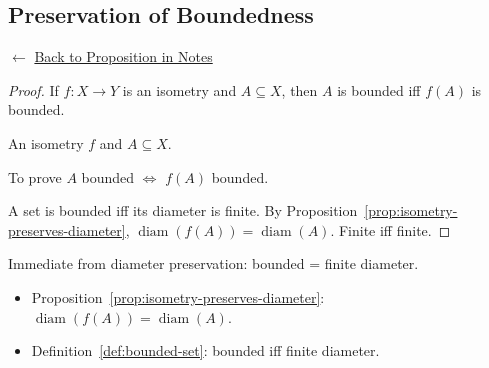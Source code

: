 
\subsection*{Preservation of Boundedness}
\label{prf:isometry-preserves-bounded}

\begin{remark*}[Return]
$\leftarrow$ \hyperref[prop:isometry-preserves-bounded]{Back to Proposition in Notes}
\end{remark*}

\begin{proof}
\Claim If $f : X \to Y$ is an isometry and $A \subseteq X$, then $A$ is
bounded iff $f(A)$ is bounded.

\Given An isometry $f$ and $A \subseteq X$.

\Goal To prove $A$ bounded $\iff$ $f(A)$ bounded.

\Strategy A set is bounded iff its diameter is finite.
By Proposition~\ref{prop:isometry-preserves-diameter},
$\operatorname{diam}(f(A)) = \operatorname{diam}(A)$.
Finite iff finite.


\end{proof}

\begin{remark*}
Immediate from diameter preservation: bounded = finite diameter.
\end{remark*}

\begin{remark*}[Dependencies]
\begin{itemize}
  \item Proposition~\ref{prop:isometry-preserves-diameter}: $\operatorname{diam}(f(A)) = \operatorname{diam}(A)$.
  \item Definition~\ref{def:bounded-set}: bounded iff finite diameter.
\end{itemize}
\end{remark*}
